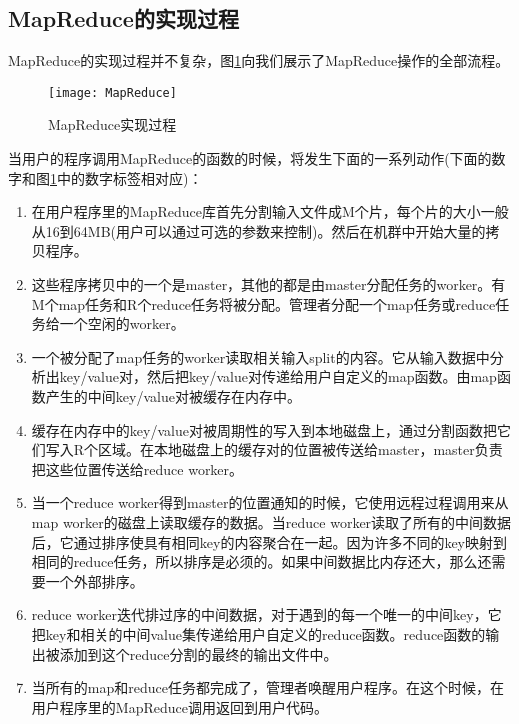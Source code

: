 \subsection{MapReduce的实现过程}
MapReduce的实现过程并不复杂，图\ref{fig:MapReduce}向我们展示了MapReduce操作的全部流程。
\begin{figure}[h]
 \centering
 \texttt{[image: MapReduce]}
 \caption{MapReduce实现过程}
 \label{fig:MapReduce}
\end{figure}

当用户的程序调用MapReduce的函数的时候，将发生下面的一系列动作(下面的数字和图\ref{fig:MapReduce}中的数字标签相对应)：

\begin{enumerate}
\item 在用户程序里的MapReduce库首先分割输入文件成M个片，每个片的大小一般从16到64MB(用户可以通过可选的参数来控制)。然后在机群中开始大量的拷贝程序。

\item 这些程序拷贝中的一个是master，其他的都是由master分配任务的worker。有M个map任务和R个reduce任务将被分配。管理者分配一个map任务或reduce任务给一个空闲的worker。

\item 一个被分配了map任务的worker读取相关输入split的内容。它从输入数据中分析出key/value对，然后把key/value对传递给用户自定义的map函数。由map函数产生的中间key/value对被缓存在内存中。

\item 缓存在内存中的key/value对被周期性的写入到本地磁盘上，通过分割函数把它们写入R个区域。在本地磁盘上的缓存对的位置被传送给master，master负责把这些位置传送给reduce worker。

\item 当一个reduce worker得到master的位置通知的时候，它使用远程过程调用来从map worker的磁盘上读取缓存的数据。当reduce worker读取了所有的中间数据后，它通过排序使具有相同key的内容聚合在一起。因为许多不同的key映射到相同的reduce任务，所以排序是必须的。如果中间数据比内存还大，那么还需要一个外部排序。

\item reduce worker迭代排过序的中间数据，对于遇到的每一个唯一的中间key，它把key和相关的中间value集传递给用户自定义的reduce函数。reduce函数的输出被添加到这个reduce分割的最终的输出文件中。

\item 当所有的map和reduce任务都完成了，管理者唤醒用户程序。在这个时候，在用户程序里的MapReduce调用返回到用户代码。
\end{enumerate}

